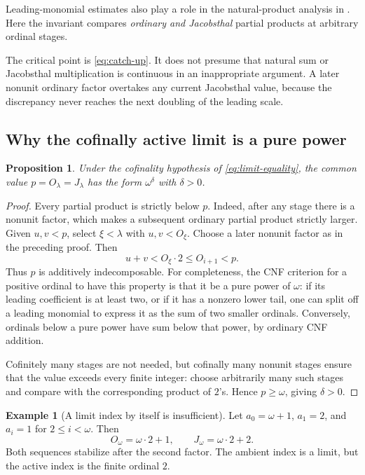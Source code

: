 \documentclass[11pt,letterpaper]{article}
\newtheorem{proposition}[theorem]{Proposition}
\theoremstyle{definition}
\newtheorem{example}[theorem]{Example}
\theoremstyle{remark}
\begin{document}
Leading-monomial estimates also play a role in the natural-product
analysis in \cite[Lemmas~2.4--2.5]{lip-product}. Here the invariant
compares \emph{ordinary and Jacobsthal} partial products at arbitrary
ordinal stages.

The critical point is \eqref{eq:catch-up}. It does not presume that natural
sum or Jacobsthal multiplication is continuous in an inappropriate
argument. A later nonunit ordinary factor overtakes any current
Jacobsthal value, because the discrepancy never reaches the next doubling
of the leading scale.

\subsection{Why the cofinally active limit is a pure power}

\begin{proposition}\label{prop:pure-limit}
Under the cofinality hypothesis of \eqref{eq:limit-equality}, the common
value $p=O_\lambda=J_\lambda$ has the form $\omega^\delta$ with $\delta>0$.
\end{proposition}

\begin{proof}
Every partial product is strictly below $p$. Indeed, after any stage
there is a nonunit factor, which makes a subsequent ordinary partial
product strictly larger. Given $u,v<p$, select $\xi<\lambda$ with
$u,v<O_\xi$. Choose a later nonunit factor as in the preceding proof.
Then
\[
 u+v<O_\xi\cdot2\leq O_{i+1}<p.
\]
Thus $p$ is additively indecomposable. For completeness, the CNF criterion
for a positive ordinal to have this property is that it be a pure power
of $\omega$: if its leading coefficient is at least two, or if it has a
nonzero lower tail, one can split off a leading monomial to express it
as the sum of two smaller ordinals. Conversely, ordinals below a pure
power have sum below that power, by ordinary CNF addition.

Cofinitely many stages are not needed, but cofinally many nonunit stages
ensure that the value exceeds every finite integer: choose arbitrarily
many such stages and compare with the corresponding product of $2$'s.
Hence $p\geq\omega$, giving $\delta>0$.
\end{proof}

\begin{example}[A limit index by itself is insufficient]\label{ex:units}
Let $a_0=\omega+1$, $a_1=2$, and $a_i=1$ for $2\leq i<\omega$.
Then
\[
 O_\omega=\omega\cdot2+1,
 \qquad J_\omega=\omega\cdot2+2.
\]
Both sequences stabilize after the second factor. The ambient index is
a limit, but the active index is the finite ordinal $2$.
\end{example}
\end{document}
